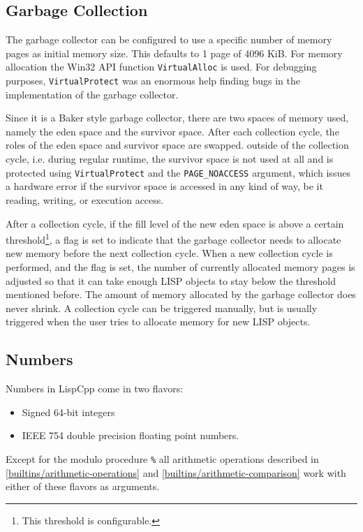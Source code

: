 \documentclass[a4paper]{scrartcl}
\begin{document}
\subsection{Garbage Collection}
\label{gc}
	The garbage collector can be configured to use a specific number of memory pages as initial memory size. This defaults to 1 page of 4096 KiB. For memory allocation the Win32 API function \lstinline|VirtualAlloc| is used. For debugging purposes, \lstinline|VirtualProtect| was an enormous help finding bugs in the implementation of the garbage collector.

	Since it is a Baker style garbage collector, there are two spaces of memory used, namely the eden space and the survivor space. After each collection cycle, the roles of the eden space and survivor space are swapped. outside of the collection cycle, i.e. during regular runtime, the survivor space is not used at all and is protected using \lstinline|VirtualProtect| and the \lstinline|PAGE_NOACCESS| argument, which issues a hardware error if the survivor space is accessed in any kind of way, be it reading, writing, or execution access.

	After a collection cycle, if the fill level of the new eden space is above a certain threshold\footnote{This threshold is configurable.}, a flag is set to indicate that the garbage collector needs to allocate new memory before the next collection cycle. When a new collection cycle is performed, and the flag is set, the number of currently allocated memory pages is adjusted so that it can take enough LISP objects to stay below the threshold mentioned before. The amount of memory allocated by the garbage collector does never shrink. A collection cycle can be triggered manually, but is usually triggered when the user tries to allocate memory for new LISP objects.

\subsection{Numbers}
\label{numbers}
	Numbers in LispCpp come in two flavors:
	\begin{itemize}
		\item Signed 64-bit integers
		\item IEEE 754 double precision floating point numbers.
	\end{itemize}

	Except for the modulo procedure \lstinline|%| all arithmetic operations described in \ref{builtins/arithmetic-operations} and \ref{builtins/arithmetic-comparison} work with either of these flavors as arguments.
	
\end{document}
